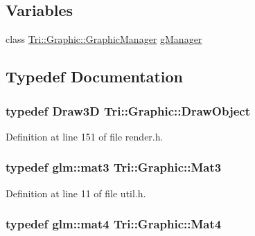 \subsection*{Variables}
\begin{DoxyCompactItemize}
\item 
class \hyperlink{class_tri_1_1_graphic_1_1_graphic_manager}{Tri\+::\+Graphic\+::\+Graphic\+Manager} \hyperlink{namespace_tri_1_1_graphic_a733d59e2e37ba2f7cf31356f228cdffc}{g\+Manager}
\end{DoxyCompactItemize}


\subsection{Typedef Documentation}
\hypertarget{namespace_tri_1_1_graphic_a86845025cd0deaa30d11479d9bbc58a5}{}
\subsubsection[{Draw\+Object}]{\setlength{\rightskip}{0pt plus 5cm}typedef {\bf Draw3\+D} {\bf Tri\+::\+Graphic\+::\+Draw\+Object}}\label{namespace_tri_1_1_graphic_a86845025cd0deaa30d11479d9bbc58a5}


Definition at line 151 of file render.\+h.

\hypertarget{namespace_tri_1_1_graphic_a31c7db008856f7e7bbef878577df5be4}{}
\subsubsection[{Mat3}]{\setlength{\rightskip}{0pt plus 5cm}typedef glm\+::mat3 {\bf Tri\+::\+Graphic\+::\+Mat3}}\label{namespace_tri_1_1_graphic_a31c7db008856f7e7bbef878577df5be4}


Definition at line 11 of file util.\+h.

\hypertarget{namespace_tri_1_1_graphic_a7b3538cdaff9bf96489c56a4f48a5f9a}{}
\subsubsection[{Mat4}]{\setlength{\rightskip}{0pt plus 5cm}typedef glm\+::mat4 {\bf Tri\+::\+Graphic\+::\+Mat4}}\label{namespace_tri_1_1_graphic_a7b3538cdaff9bf96489c56a4f48a5f9a}


